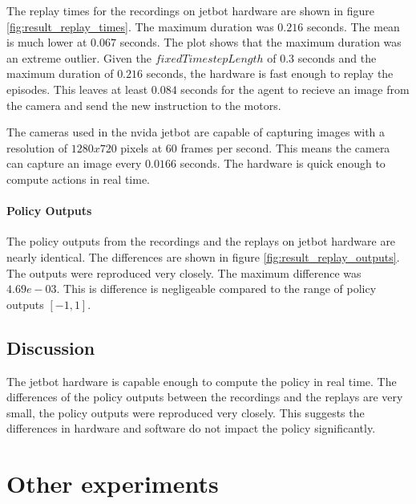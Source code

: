 The replay times for the recordings on jetbot hardware are shown in figure \ref{fig:result_replay_times}. The maximum duration was $0.216$ seconds. The mean is much lower at $0.067$ seconds. The plot shows that the maximum duration was an extreme outlier.
Given the $fixedTimestepLength$ of $0.3$ seconds and the maximum duration of $0.216$ seconds, the hardware is fast enough to replay the episodes. This leaves at least $0.084$ seconds for the agent to recieve an image from the camera and send the new instruction to the motors.

The cameras used in the nvida jetbot are capable of capturing images with a resolution of $1280x720$ pixels at $60$ frames per second. This means the camera can capture an image every $0.0166$ seconds. The hardware is quick enough to compute actions in real time.


\paragraph{Policy Outputs}

The policy outputs from the recordings and the replays on jetbot hardware are nearly identical. The differences are shown in figure \ref{fig:result_replay_outputs}. The outputs were reproduced very closely. The maximum difference was $4.69e-03$.  This is difference is negligeable compared to the range of policy outputs $[-1,1]$.


\subsection{Discussion}

The jetbot hardware is capable enough to compute the policy in real time. The differences of the policy outputs between the recordings and the replays are very small, the policy outputs were reproduced very closely. This suggests the differences in hardware and software do not impact the policy significantly.

\section{Other experiments}

